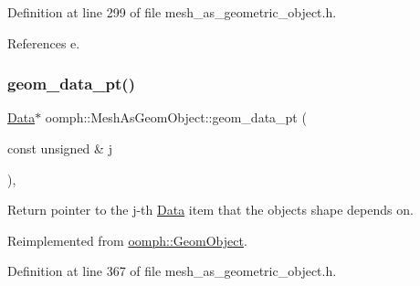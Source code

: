 Definition at line 299 of file mesh\+\_\+as\+\_\+geometric\+\_\+object.\+h.



References e.

\mbox{\label{classoomph_1_1MeshAsGeomObject_a8d19ac59e6b236c61ffbcd434ad3b339}} 
\subsubsection{\texorpdfstring{geom\+\_\+data\+\_\+pt()}{geom\_data\_pt()}}
{\footnotesize\ttfamily \hyperlink{classoomph_1_1Data}{Data}$\ast$ oomph\+::\+Mesh\+As\+Geom\+Object\+::geom\+\_\+data\+\_\+pt (\begin{DoxyParamCaption}\item[{const unsigned \&}]{j }\end{DoxyParamCaption})\hspace{0.3cm}{\ttfamily [inline]}, {\ttfamily [virtual]}}



Return pointer to the j-\/th \hyperlink{classoomph_1_1Data}{Data} item that the object\textquotesingle{}s shape depends on. 



Reimplemented from \hyperlink{classoomph_1_1GeomObject_ae1940fc6a3050e645c3882f2f6f3a202}{oomph\+::\+Geom\+Object}.



Definition at line 367 of file mesh\+\_\+as\+\_\+geometric\+\_\+object.\+h.

\mbox{\label{classoomph_1_1MeshAsGeomObject_a8a9fecb98d4e0a151e3b9e58aa433be9}} 
